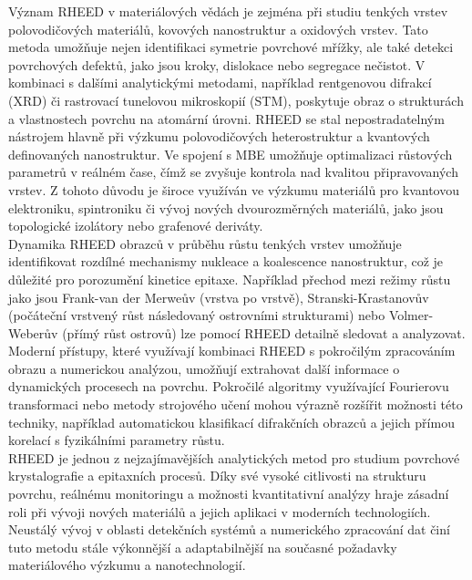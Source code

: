 \documentclass{article}
\begin{document}
Význam RHEED v materiálových vědách je zejména při studiu tenkých vrstev polovodičových materiálů, kovových nanostruktur a oxidových vrstev. Tato metoda umožňuje nejen identifikaci symetrie povrchové mřížky, ale také detekci povrchových defektů, jako jsou kroky, dislokace nebo segregace nečistot. V kombinaci s dalšími analytickými metodami, například rentgenovou difrakcí (XRD) či rastrovací tunelovou mikroskopií (STM), poskytuje obraz o strukturách a vlastnostech povrchu na atomární úrovni. RHEED se stal nepostradatelným nástrojem hlavně při výzkumu polovodičových heterostruktur a kvantových definovaných nanostruktur. Ve spojení s MBE umožňuje optimalizaci růstových parametrů v reálném čase, čímž se zvyšuje kontrola nad kvalitou připravovaných vrstev. Z tohoto důvodu je široce využíván ve výzkumu materiálů pro kvantovou elektroniku, spintroniku či vývoj nových dvourozměrných materiálů, jako jsou topologické izolátory nebo grafenové deriváty.\\

Dynamika RHEED obrazců v průběhu růstu tenkých vrstev umožňuje identifikovat rozdílné mechanismy nukleace a koalescence nanostruktur, což je důležité pro porozumění kinetice epitaxe. Například přechod mezi režimy růstu jako jsou Frank-van der Merweův (vrstva po vrstvě), Stranski-Krastanovův (počáteční vrstvený růst následovaný ostrovními strukturami) nebo Volmer-Weberův (přímý růst ostrovů) lze pomocí RHEED detailně sledovat a analyzovat.\\

Moderní přístupy, které využívají kombinaci RHEED s pokročilým zpracováním obrazu a numerickou analýzou, umožňují extrahovat další informace o dynamických procesech na povrchu. Pokročilé algoritmy využívající Fourierovu transformaci nebo metody strojového učení mohou výrazně rozšířit možnosti této techniky, například automatickou klasifikací difrakčních obrazců a jejich přímou korelací s fyzikálními parametry růstu.\\

RHEED je jednou z nejzajímavějších analytických metod pro studium povrchové krystalografie a epitaxních procesů. Díky své vysoké citlivosti na strukturu povrchu, reálnému monitoringu a možnosti kvantitativní analýzy hraje zásadní roli při vývoji nových materiálů a jejich aplikaci v moderních technologiích. Neustálý vývoj v oblasti detekčních systémů a numerického zpracování dat činí tuto metodu stále výkonnější a adaptabilnější na současné požadavky materiálového výzkumu a nanotechnologií.\\
\end{document}
